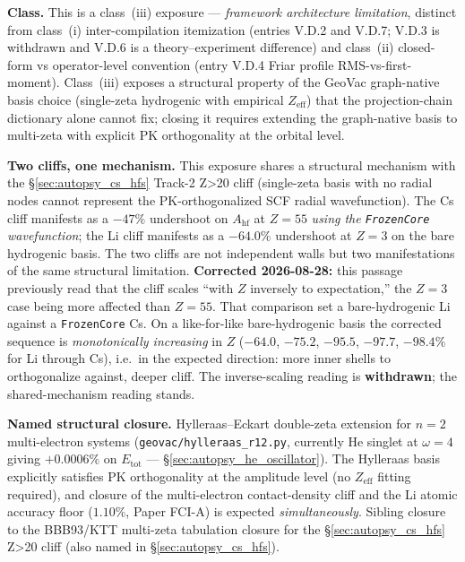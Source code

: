 \documentclass[11pt]{article}
\begin{document}
\textbf{Class.}  This is a class~(iii) exposure --- \emph{framework
architecture limitation}, distinct from class~(i) inter-compilation
itemization (entries V.D.2 and V.D.7; V.D.3 is withdrawn and V.D.6 is a
theory--experiment difference)
and class~(ii) closed-form vs operator-level convention (entry V.D.4
Friar profile RMS-vs-first-moment).  Class~(iii) exposes a structural
property of the GeoVac graph-native basis choice (single-zeta
hydrogenic with empirical $Z_\text{eff}$) that the projection-chain
dictionary alone cannot fix; closing it requires extending the
graph-native basis to multi-zeta with explicit PK orthogonality at
the orbital level.

\textbf{Two cliffs, one mechanism.}  This exposure shares a structural
mechanism with the \S\ref{sec:autopsy_cs_hfs} Track-2 Z\textgreater 20
cliff (single-zeta basis with no radial nodes cannot represent the
PK-orthogonalized SCF radial wavefunction).  The Cs cliff manifests
as a $-47\%$ undershoot on $A_\text{hf}$ at $Z=55$ \emph{using the
\texttt{FrozenCore} wavefunction}; the Li cliff manifests as a
$-64.0\%$ undershoot at $Z=3$ on the bare hydrogenic basis.  The two
cliffs are not independent walls but two manifestations of the same
structural limitation.  \textbf{Corrected 2026-08-28:} this passage
previously read that the cliff scales ``with $Z$ inversely to
expectation,'' the $Z=3$ case being more affected than $Z=55$.  That
comparison set a bare-hydrogenic Li against a \texttt{FrozenCore} Cs.
On a like-for-like bare-hydrogenic basis the corrected sequence is
\emph{monotonically increasing} in $Z$ ($-64.0$, $-75.2$, $-95.5$,
$-97.7$, $-98.4\%$ for Li through Cs), i.e.\ in the expected direction:
more inner shells to orthogonalize against, deeper cliff.  The
inverse-scaling reading is \textbf{withdrawn}; the shared-mechanism
reading stands.

\textbf{Named structural closure.}  Hylleraas--Eckart double-zeta
extension for $n=2$ multi-electron systems
(\texttt{geovac/hylleraas\_r12.py}, currently He singlet at $\omega=4$
giving $+0.0006\%$ on $E_\text{tot}$ --- \S\ref{sec:autopsy_he_oscillator}).
The Hylleraas basis explicitly satisfies PK orthogonality at the
amplitude level (no $Z_\text{eff}$ fitting required), and closure of
the multi-electron contact-density cliff and the Li atomic accuracy
floor ($1.10\%$, Paper FCI-A) is expected \emph{simultaneously}.
Sibling closure to the BBB93/KTT multi-zeta tabulation closure for
the \S\ref{sec:autopsy_cs_hfs} Z\textgreater 20 cliff (also named in
\S\ref{sec:autopsy_cs_hfs}).
\end{document}
